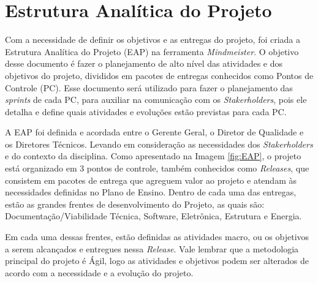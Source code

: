 \section{Estrutura Analítica do Projeto}

Com a necessidade de definir os objetivos e as entregas do projeto, foi criada a Estrutura Analítica do Projeto (EAP) na ferramenta \textit{Mindmeister}. O objetivo desse documento é fazer o planejamento de alto nível das atividades e dos objetivos do projeto, divididos em pacotes de entregas conhecidos como Pontos de Controle (PC). Esse documento será utilizado para fazer o planejamento das  \textit{sprints} de cada PC, para auxiliar na comunicação com os  \textit{Stakerholders}, pois ele detalha e define quais atividades e evoluções estão previstas para cada PC.

A EAP foi definida e acordada entre o Gerente Geral, o Diretor de Qualidade e os Diretores Técnicos. Levando em consideração as necessidades dos \textit{Stakerholders} e do contexto da disciplina. Como apresentado na Imagem \ref{fig:EAP}, o projeto está organizado em 3 pontos de controle, também conhecidos como \textit{Releases}, que consistem em pacotes de entrega que agreguem valor ao projeto e atendam às necessidades definidas no Plano de Ensino. Dentro de cada uma das entregas, estão as grandes frentes de desenvolvimento do Projeto, as quais são: Documentação/Viabilidade Técnica, Software, Eletrônica, Estrutura e Energia.

Em cada uma dessas frentes, estão definidas as atividades macro, ou os objetivos a serem alcançados e entregues nessa  \textit{Release}. Vale lembrar que a metodologia principal do projeto é Ágil, logo as atividades e objetivos podem ser alterados de acordo com a necessidade e a evolução do projeto.